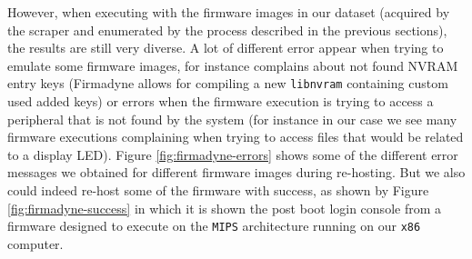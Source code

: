 However, when executing with the firmware images in our dataset (acquired by the scraper and enumerated by the process described in the previous sections), the results are still very diverse. A lot of different error appear when trying to emulate some firmware images, for instance complains about not found NVRAM entry keys (Firmadyne allows for compiling a new {\tt libnvram} containing custom used added keys) or errors when the firmware execution is trying to access a peripheral that is not found by the system (for instance in our case we see many firmware executions complaining when trying to access files that would be related to a display LED). Figure \ref{fig:firmadyne-errors} shows some of the different error messages we obtained for different firmware images during re-hosting. But we also could indeed re-host some of the firmware with success, as shown by Figure \ref{fig:firmadyne-success} in which it is shown the post boot login console from a firmware designed to execute on the {\tt MIPS} architecture running on our {\tt x86} computer.

